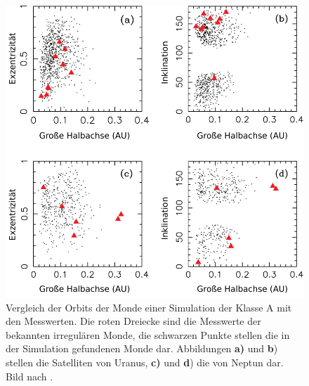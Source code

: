 \documentclass[12pt,a4paper,twoside,open=right,bibliography=totoc]{scrbook}
\renewcommand{\cite}{ \citep}
\begin{document}
\begin{figure}[tbn]
\centering
\includegraphics[scale=0.7]{img/Nesvorny2007-4}
\caption{Vergleich der Orbits der Monde einer Simulation der Klasse A mit den Messwerten. Die roten Dreiecke sind die Messwerte der bekannten irregulären Monde, die schwarzen Punkte stellen die in der Simulation gefundenen Monde dar. Abbildungen \textbf{a)} und \textbf{b}) stellen die Satelliten von Uranus, \textbf{c)} und \textbf{d}) die von Neptun dar. Bild nach \cite{Nesvorny2007}.}
\label{fig:KlasseA_Mondorbitale}
\end{figure}
\end{document}
